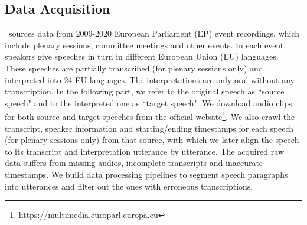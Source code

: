 \subsection{Data Acquisition}
\vp~sources data from 2009-2020 European Parliament (EP) event recordings, which include plenary sessions, committee meetings and other events. In each event, speakers give speeches in turn in different European Union (EU) languages. These speeches are partially transcribed (for plenary sessions only)
and interpreted into 24 EU languages. The interpretations are only oral without any transcription. In the following part, we refer to the original speech as ``source speech" and to the interpreted one as ``target speech".
We download audio clips for both source and target speeches from the official website\footnote{https://multimedia.europarl.europa.eu}. We also crawl the transcript, speaker information and starting/ending timestamps for each speech (for plenary sessions only) from that source, with which we later align the speech to its transcript and interpretation utterance by utterance. The acquired raw data suffers from missing audios, incomplete transcripts and inaccurate timestamps. We build data processing pipelines to segment speech paragraphs into utterances and filter out the ones with erroneous transcriptions.

